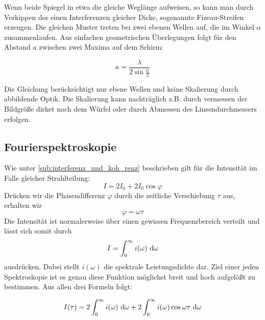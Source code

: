		Wenn beide Spiegel in etwa die gleiche Weglänge aufweisen, so kann man durch Verkippen des einen Interferenzen gleicher Dicke, sogenannte Fizeau-Streifen erzeugen.
		Die gleichen Muster treten bei zwei ebenen Wellen auf, die im Winkel $\alpha$ zusammenlaufen.
		Aus einfachen geometrischen Überlegungen folgt für den Abstand $a$ zwischen zwei Maxima auf dem Schirm:

		\[ a = \frac{\lambda}{2 \sin\frac{\alpha}{2}} \]

		Die Gleichung berücksichtigt nur ebene Wellen und keine Skalierung durch abbildende Optik.
		Die Skalierung kann nachträglich z.B. durch vermessen der Bildgröße dirket nach dem Würfel oder durch Abmessen des Linsendurchmessers erfolgen.


	\subsection{Fourierspektroskopie} %
	\label{sub:fourierspektroskopie}
		
		Wie unter \ref{sub:interferenz_und_koh_renz} beschrieben gilt für die Intensität im Falle gleicher Strahlteilung:
		\[ I = 2 I_0 + 2  I_0 \cos\varphi \]
		Drücken wir die Phasendifferenz $\varphi$ durch die zeitliche Verschiebung $\tau$ aus, erhalten wir
		\[ \varphi = \omega \tau \]
		Die Intensität ist normalerweise über einen gewissen Frequenzbereich verteilt und lässt sich somit durch
		\[ I = \int_{0}^{\infty} i(\omega)\ \mathrm{d} \omega \]
		ausdrücken.
		Dabei stellt $i(\omega)$ die spektrale Leistungsdichte dar.
		Ziel einer jeden Spektroskopie ist es genau diese Funktion möglichst breit und hoch aufgelößt zu bestimmen.
		Aus allen drei Formeln folgt:

		\[ I(\tau) = 2 \int_{0}^{\infty} i(\omega)\ \mathrm{d} \omega + 2 \int_{0}^{\infty} i(\omega) \cos\omega \tau \ \mathrm{d} \omega \]

